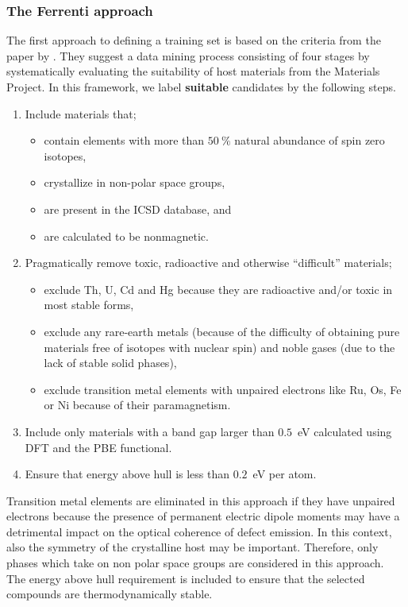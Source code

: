 \documentclass[superscriptaddress,unsortedaddress,
 amsmath,amssymb,
 aps,
]{revtex4-2}
\begin{document}
\subsubsection*{The Ferrenti approach}
The first approach to defining a training set is based on the criteria from the paper by \citeauthor{Ferrenti2020} \cite{Ferrenti2020}.
They suggest a data mining process consisting of four stages by systematically evaluating the suitability of host materials from the Materials Project. In this framework, we label \textbf{suitable} candidates by the following steps. 
\begin{enumerate}
    \item Include materials that;
    \begin{itemize}
        \item contain elements with more than $50 \ \%$ natural abundance of spin zero  isotopes,
        \item crystallize in non-polar space groups,
        \item are present in the ICSD database, and
        \item are calculated to be nonmagnetic. 
    \end{itemize}
    \item Pragmatically remove toxic, radioactive and otherwise ``difficult'' materials;
    \begin{itemize}
        \item exclude Th, U, Cd and Hg because they are radioactive and/or toxic in most stable forms,
        \item exclude any rare-earth metals (because of the difficulty of obtaining pure materials free of isotopes with nuclear spin) and noble gases (due to the lack of stable solid phases),
        \item exclude transition metal elements with unpaired electrons like Ru, Os, Fe or Ni because of their paramagnetism.
    \end{itemize}
    \item Include only materials with a band gap larger than $0.5$~eV calculated using DFT and the PBE functional. 
    \item Ensure that energy above hull is less than $0.2$~eV per atom.
\end{enumerate}

Transition metal elements are eliminated in this approach if they have unpaired electrons because the presence of permanent electric dipole moments may have a detrimental impact on the optical coherence of defect emission. In this context, also the symmetry of the crystalline host may be important. Therefore, only phases which take on non polar space groups are considered in this approach. 
The energy above hull requirement is included to ensure that the selected compounds are thermodynamically stable. 
\end{document}
